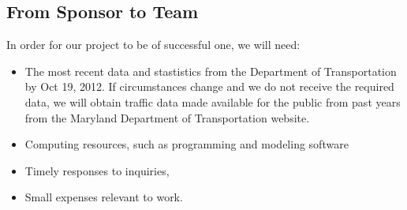 \documentclass[12pt,letterpaper]{article}
\theoremstyle{definition}
\begin{document}
\subsection{From Sponsor to Team} %

In order for our project to be of successful one, we will need:
\begin{itemize}
    \item The most recent data and stastistics from the Department of Transportation by Oct 19, 2012. If circumstances change and we do not receive the required data, we will obtain traffic data made available for the public from past years from the Maryland Department of Transportation website.
    \item Computing resources, such as programming and modeling software
    \item Timely responses to inquiries, 
    \item Small expenses relevant to work.
\end{itemize}


%
%
\end{document}
